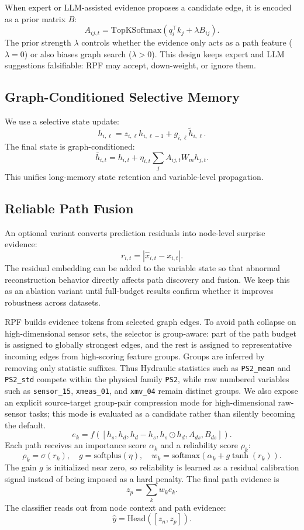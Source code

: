 \documentclass[letterpaper]{article}
\begin{document}
When expert or LLM-assisted evidence proposes a candidate edge, it is encoded as a prior matrix \(B\):
\[
A_{ij,t} = \text{TopKSoftmax}(q_i^\top k_j + \lambda B_{ij}).
\]
The prior strength \(\lambda\) controls whether the evidence only acts as a path feature (\(\lambda=0\)) or also biases graph search (\(\lambda>0\)). This design keeps expert and LLM suggestions falsifiable: RPF may accept, down-weight, or ignore them.

\subsection{Graph-Conditioned Selective Memory}

We use a selective state update:
\[
h_{i,\ell} = z_{i,\ell} h_{i,\ell-1} + g_{i,\ell} \tilde h_{i,\ell}.
\]
The final state is graph-conditioned:
\[
\bar h_{i,t} = h_{i,t} + \eta_{i,t}\sum_j A_{ij,t} W_m h_{j,t}.
\]
This unifies long-memory state retention and variable-level propagation.

\subsection{Reliable Path Fusion}

An optional variant converts prediction residuals into node-level surprise evidence:
\[
r_{i,t}=|\hat x_{i,t}-x_{i,t}|.
\]
The residual embedding can be added to the variable state so that abnormal reconstruction behavior directly affects path discovery and fusion. We keep this as an ablation variant until full-budget results confirm whether it improves robustness across datasets.

RPF builds evidence tokens from selected graph edges. To avoid path collapse on high-dimensional sensor sets, the selector is group-aware: part of the path budget is assigned to globally strongest edges, and the rest is assigned to representative incoming edges from high-scoring feature groups. Groups are inferred by removing only statistic suffixes. Thus Hydraulic statistics such as \texttt{PS2\_mean} and \texttt{PS2\_std} compete within the physical family \texttt{PS2}, while raw numbered variables such as \texttt{sensor\_15}, \texttt{xmeas\_01}, and \texttt{xmv\_04} remain distinct groups. We also expose an explicit source-target group-pair compression mode for high-dimensional raw-sensor tasks; this mode is evaluated as a candidate rather than silently becoming the default.
\[
e_k = f([h_s, h_d, h_d-h_s, h_s \odot h_d, A_{ds}, B_{ds}]).
\]
Each path receives an importance score \(\alpha_k\) and a reliability score \(\rho_k\):
\[
\rho_k=\sigma(r_k), \quad
g=\text{softplus}(\eta), \quad
w_k = \text{softmax}(\alpha_k + g\tanh(r_k)).
\]
The gain \(g\) is initialized near zero, so reliability is learned as a residual calibration signal instead of being imposed as a hard penalty.
The final path evidence is
\[
z_p = \sum_k w_k e_k.
\]
The classifier reads out from node context and path evidence:
\[
\hat y = \text{Head}([z_n, z_p]).
\]
\end{document}
